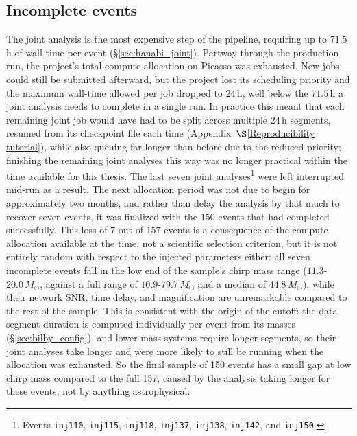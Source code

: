 \subsection{Incomplete events}
\label{sec:incomplete_events}

The joint analysis is the most expensive step of the pipeline, requiring up to $71.5$\,h of wall time per event (\S\ref{sec:hanabi_joint}). Partway through the production run, the project's total compute allocation on Picasso was exhausted. New jobs could still be submitted afterward, but the project lost its scheduling priority and the maximum wall-time allowed per job dropped to $24$\,h, well below the $71.5$\,h a joint analysis needs to complete in a single run. In practice this meant that each remaining joint job would have had to be split across multiple $24$\,h segments, resumed from its checkpoint file each time (Appendix~$\S$\ref{Reproducibility tutorial}), while also queuing far longer than before due to the reduced priority; finishing the remaining joint analyses this way was no longer practical within the time available for this thesis. The last seven joint analyses\footnote{Events \texttt{inj110}, \texttt{inj115}, \texttt{inj118}, \texttt{inj137}, \texttt{inj138}, \texttt{inj142}, and \texttt{inj150}.} were left interrupted mid-run as a result. The next allocation period was not due to begin for approximately two months, and rather than delay the analysis by that much to recover seven events, it was finalized with the $150$ events that had completed successfully. This loss of $7$ out of $157$ events is a consequence of the compute allocation available at the time, not a scientific selection criterion, but it is not entirely random with respect to the injected parameters either: all seven incomplete events fall in the low end of the sample's chirp mass range ($11.3$-$20.0\,M_\odot$, against a full range of $10.9$-$79.7\,M_\odot$ and a median of $44.8\,M_\odot$), while their network SNR, time delay, and magnification are unremarkable compared to the rest of the sample. This is consistent with the origin of the cutoff: the data segment duration is computed individually per event from its masses (\S\ref{sec:bilby_config}), and lower-mass systems require longer segments, so their joint analyses take longer and were more likely to still be running when the allocation was exhausted. So the final sample of 150 events has a small gap at low chirp mass compared to the full 157, caused by the analysis taking longer for these events, not by anything astrophysical.





